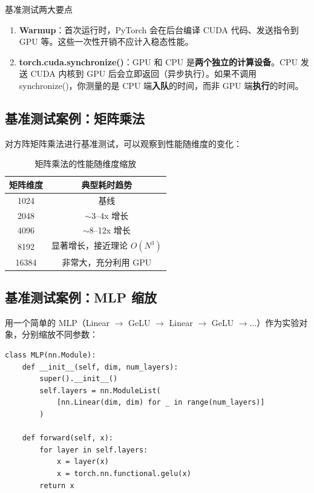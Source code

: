 \documentclass[a4paper]{article}
\begin{document}
\begin{importantbox}{基准测试两大要点}
\begin{enumerate}
    \item \textbf{Warmup}：首次运行时，PyTorch 会在后台编译 CUDA 代码、发送指令到 GPU 等。这些一次性开销不应计入稳态性能。
    \item \textbf{torch.cuda.synchronize()}：GPU 和 CPU 是\textbf{两个独立的计算设备}。CPU 发送 CUDA 内核到 GPU 后会立即返回（异步执行）。如果不调用 synchronize()，你测量的是 CPU 端\textbf{入队}的时间，而非 GPU 端\textbf{执行}的时间。
\end{enumerate}
\end{importantbox}

\subsection{基准测试案例：矩阵乘法}

对方阵矩阵乘法进行基准测试，可以观察到性能随维度的变化：

\begin{table}[H]
\centering
\begin{tabular}{cc}
\toprule
\textbf{矩阵维度} & \textbf{典型耗时趋势} \\
\midrule
1024 & 基线 \\
2048 & $\sim$3--4x 增长 \\
4096 & $\sim$8--12x 增长 \\
8192 & 显著增长，接近理论 $O(N^3)$ \\
16384 & 非常大，充分利用 GPU \\
\bottomrule
\end{tabular}
\caption{矩阵乘法的性能随维度缩放}
\end{table}

\subsection{基准测试案例：MLP 缩放}

用一个简单的 MLP（Linear $\rightarrow$ GeLU $\rightarrow$ Linear $\rightarrow$ GeLU $\rightarrow \ldots$）作为实验对象，分别缩放不同参数：

\begin{lstlisting}[caption={MLP 定义}]
class MLP(nn.Module):
    def __init__(self, dim, num_layers):
        super().__init__()
        self.layers = nn.ModuleList(
            [nn.Linear(dim, dim) for _ in range(num_layers)]
        )

    def forward(self, x):
        for layer in self.layers:
            x = layer(x)
            x = torch.nn.functional.gelu(x)
        return x
\end{lstlisting}
\end{document}
